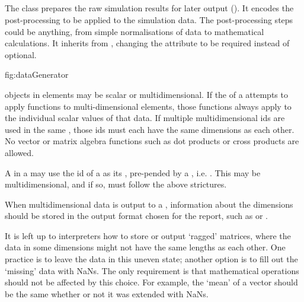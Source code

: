 \subsection{}
\label{class:dataGenerator}

The  class prepares the raw simulation results for later output (). It encodes the post-processing  to be applied to the simulation data. The post-processing steps could be anything, from simple normalisations of data to mathematical calculations.  It inherits from \Calculation, changing the  attribute to be required instead of optional.

 {fig:dataGenerator}

\begin{blockChanged}
\Variable objects in \DataGenerator elements may be scalar or multidimensional.  If the \Math of a \DataGenerator attempts to apply functions to multi-dimensional elements, those functions always apply to the individual scalar values of that data.  If multiple multidimensional \Variable ids are used in the same \Math, those ids must each have the same dimensions as each other.  No vector or matrix algebra functions such as dot products or cross products are allowed.

A \Variable in a \DataGenerator may use the id of a \DataSource as its , pre-pended by a , i.e. .  This \Variable may be multidimensional, and if so, must follow the above strictures.

When multidimensional data is output to a \Report, information about the dimensions should be stored in the output format chosen for the report, such as \CSV or \HDF.

It is left up to interpreters how to store or output `ragged' matrices, where the data in some dimensions might not have the same lengths as each other.  One practice is to leave the data in this uneven state; another option is to fill out the `missing' data with NaNs.  The only requirement is that mathematical operations should not be affected by this choice.  For example, the `mean' of a vector should be the same whether or not it was extended with NaNs.


\end{blockChanged}
